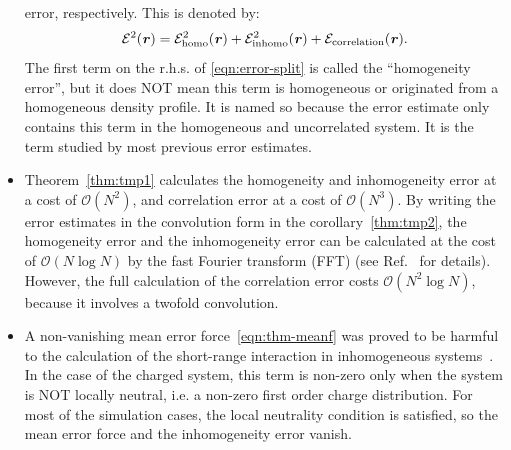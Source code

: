 \documentclass[aps,pre,preprint,unsortedaddress]{revtex4}
\newcommand{\redc}[1]{{\color{red} #1}}
\renewcommand{\v}[1]{\textbf{\textit{#1}}}
\begin{document}
\begin{itemize}
  error, respectively.
  This is denoted by:
  \begin{align}\label{eqn:error-split}
    \mathcal E^2(\v r)
    =
    \mathcal E^2_{\textrm{homo}}(\v r) +
    \mathcal E^2_{\textrm{inhomo}}(\v r) +
    \mathcal E_{\textrm{correlation}}(\v r).
  \end{align}
  The first term on the r.h.s. of \eqref{eqn:error-split} is called
  the ``homogeneity error'', but it does NOT mean this term is
  homogeneous or originated from a homogeneous density profile.  It is
  named so because the error estimate only contains this term in the
  homogeneous and uncorrelated system. It is the term studied by most
  previous error estimates.
\item
  Theorem~\ref{thm:tmp1} calculates the homogeneity and inhomogeneity
  error at a cost of $\mathcal O(N^2)$, and correlation error
  at a cost of $\mathcal O(N^3)$.
  By writing the error estimates in the convolution form in
  the corollary~\ref{thm:tmp2},
  the homogeneity error and the inhomogeneity
  error can be calculated at the cost of $\mathcal O(N\log N)$ by the
  fast Fourier transform (FFT) (see Ref.~\cite{wang2012} for details).
  However, the full calculation of the correlation error costs $\mathcal
  O(N^2\log N)$, because it involves a twofold convolution.
\item A non-vanishing mean error force~\eqref{eqn:thm-meanf} was proved
  to be
  harmful to the calculation of the short-range interaction
  in inhomogeneous systems~\cite{wang2012}.
  In the case of the charged system, this
  term is non-zero only when the system is NOT locally neutral,
  i.e. a non-zero first order charge distribution. For
  most of the simulation cases, the \redc{local neutrality} condition is
  satisfied, so the mean error force and the inhomogeneity error
  vanish.
\end{itemize}
\end{document}
